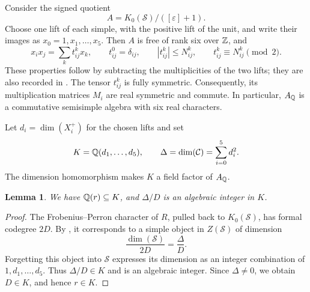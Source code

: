 \documentclass[11pt]{article}
\newtheorem{lemma}[theorem]{Lemma}
\theoremstyle{remark}\newtheorem{remark}[theorem]{Remark}
\begin{document}
Consider the signed quotient
\[
A=K_0(\mathcal S)/([\varepsilon]+1).
\]
Choose one lift of each simple, with the positive lift of the unit, and write their images as $x_0=1,x_1,\ldots,x_5$. Then $A$ is free of rank six over $\mathbb Z$, and
\begin{equation}\label{eq:signed}
x_ix_j=\sum_k t_{ij}^kx_k,\qquad t_{ij}^0=\delta_{ij},\qquad
|t_{ij}^k|\le N_{ij}^k,\qquad t_{ij}^k\equiv N_{ij}^k\pmod2.
\end{equation}
These properties follow by subtracting the multiplicities of the two lifts; they are also recorded in \cite[Section 5.1]{O}. The tensor $t_{ij}^k$ is fully symmetric. Consequently, its multiplication matrices $M_i$ are real symmetric and commute. In particular, $A_\mathbb Q$ is a commutative semisimple algebra with six real characters.

Let $d_i=\dim(X_i^+)$ for the chosen lifts and set
\[
K=\mathbb Q(d_1,\ldots,d_5),\qquad\Delta=\dim(\mathcal C)=\sum_{i=0}^5d_i^2.
\]
The dimension homomorphism makes $K$ a field factor of $A_\mathbb Q$.

\begin{lemma}\label{lem:fieldcontainment}
We have $\mathbb Q(r)\subseteq K$, and $\Delta/D$ is an algebraic integer in $K$.
\end{lemma}
\begin{proof}
The Frobenius--Perron character of $R$, pulled back to $K_0(\mathcal S)$, has formal codegree $2D$. By \cite[Theorem 2.13]{O}, it corresponds to a simple object in $Z(\mathcal S)$ of dimension
\[
\frac{\dim(\mathcal S)}{2D}=\frac\Delta D.
\]
Forgetting this object into $\mathcal S$ expresses its dimension as an integer combination of $1,d_1,\ldots,d_5$. Thus $\Delta/D\in K$ and is an algebraic integer. Since $\Delta\ne0$, we obtain $D\in K$, and hence $r\in K$.
\end{proof}
\end{document}
